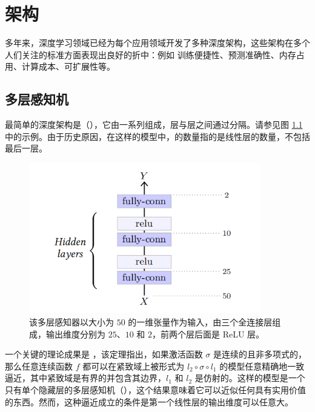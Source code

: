 \chapter{架构}\label{ch5}

多年来，深度学习领域已经为每个应用领域开发了多种深度架构，这些架构在多个人们关注的标准方面表现出良好的折中：例如 训练便捷性、预测准确性、内存占用、计算成本、可扩展性等。

\section{多层感知机}\label{sec5.1}

最简单的深度架构是（），它由一系列组成，层与层之间通过分隔。请参见图 \ref{fig5.1} 中的示例。由于历史原因，在这样的模型中，的数量指的是线性层的数量，不包括最后一层。

\begin{figure}
    \centering
    \includegraphics[width=0.9\textwidth]{fig/fig5.1.png}
    \caption[多层感知机]{该多层感知器以大小为 $50$ 的一维张量作为输入，由三个全连接层组成，输出维度分别为 $25$、$10$ 和 $2$，前两个层后面是 ReLU 层。}
    \label{fig5.1}
\end{figure}

一个关键的理论成果是 \citep{Cybenko1989}，该定理指出，如果激活函数 $\sigma$ 是连续的且非多项式的，那么任意连续函数 $f$ 都可以在紧致域上被形式为 $l_2 \circ \sigma \circ l_1$ 的模型任意精确地一致逼近，其中紧致域是有界的并包含其边界，$l_1$ 和 $l_2$ 是仿射的。这样的模型是一个只有单个隐藏层的多层感知机（），这个结果意味着它可以近似任何具有实用价值的东西。然而，这种逼近成立的条件是第一个线性层的输出维度可以任意大。

